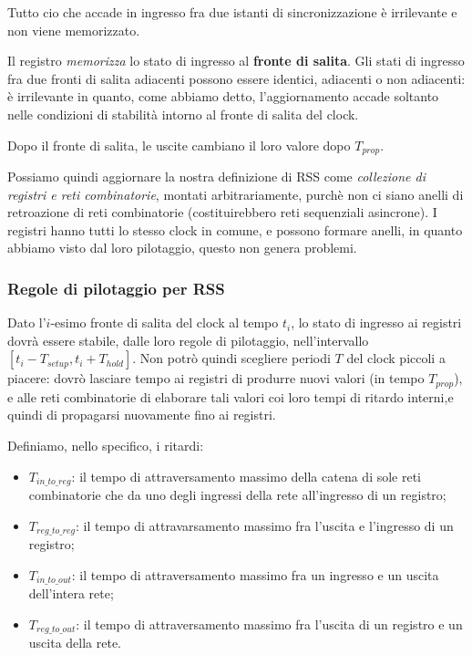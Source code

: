 \documentclass[a4paper,11pt]{article}
\begin{document}
Tutto cio che accade in ingresso fra due istanti di sincronizzazione è irrilevante e non viene memorizzato.

\par\smallskip

Il registro \textit{memorizza} lo stato di ingresso al \textbf{fronte di salita}.
Gli stati di ingresso fra due fronti di salita adiacenti possono essere identici, adiacenti o non adiacenti: è irrilevante in quanto, come abbiamo detto, l'aggiornamento accade soltanto nelle condizioni di stabilità intorno al fronte di salita del clock.

Dopo il fronte di salita, le uscite cambiano il loro valore dopo $T_{prop}$.

\par\medskip

Possiamo quindi aggiornare la nostra definizione di RSS come \textit{collezione di registri e reti combinatorie}, montati arbitrariamente, purchè non ci siano anelli di retroazione di reti combinatorie (costituirebbero reti sequenziali asincrone).
I registri hanno tutti lo stesso clock in comune, e possono formare anelli, in quanto abbiamo visto dal loro pilotaggio, questo non genera problemi.

\subsubsection{Regole di pilotaggio per RSS}
Dato l'$i$-esimo fronte di salita del clock al tempo $t_i$, lo stato di ingresso ai registri dovrà essere stabile, dalle loro regole di pilotaggio, nell'intervallo $[t_i - T_{setup}, t_i + T_{hold}]$.
Non potrò quindi scegliere periodi $T$ del clock piccoli a piacere: dovrò lasciare tempo ai registri di produrre nuovi valori (in tempo $T_{prop}$), e alle reti combinatorie di elaborare tali valori coi loro tempi di ritardo interni,e quindi di propagarsi nuovamente fino ai registri.

Definiamo, nello specifico, i ritardi:
\begin{itemize}
	\item $T_{in\_to\_reg}$: il tempo di attraversamento massimo della catena di sole reti combinatorie che da uno degli ingressi della rete all'ingresso di un registro;
	\item $T_{reg\_to\_reg}$: il tempo di attravarsamento massimo fra l'uscita e l'ingresso di un registro;
	\item $T_{in\_to\_out}$: il tempo di attraversamento massimo fra un ingresso e un uscita dell'intera rete;
	\item $T_{reg\_to\_out}$: il tempo di attraversamento massimo fra l'uscita di un registro e un uscita della rete.
\end{itemize}
\end{document}
